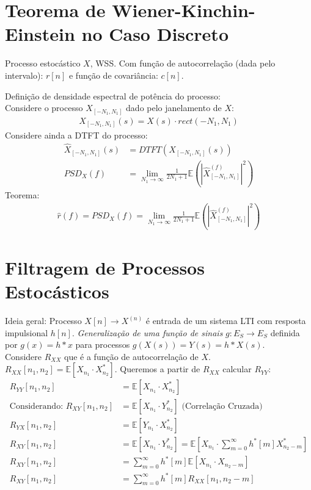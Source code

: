 \documentclass{article}
\begin{document}
\setlength{\abovedisplayskip}{12pt}
\setlength{\belowdisplayskip}{12pt}
\setlength{\abovedisplayshortskip}{0pt}
\setlength{\belowdisplayshortskip}{0pt}
\setlength{\jot}{1pt}

\section{Teorema de Wiener-Kinchin-Einstein no Caso Discreto}
Processo estocástico $X$, WSS. Com função de autocorrelação (dada pelo intervalo): $r[n]$ e função
de covariância: $c[n]$.

Definição de densidade espectral de potência do processo:
\\
Considere o processo $X_{[-N_1,N_1]}$ dado pelo janelamento de $X$:
\begin{align*}
    X_{[-N_1,N_1]}(s) = X(s) \cdot rect(-N_1,N_1)
\end{align*}
Considere ainda a DTFT do processo:
\begin{align*}
    \widehat{X}_{[-N_1,N_1]}(s) &= DTFT(X_{[-N_1,N_1]}(s)) \\
    PSD_X(f) &= \lim_{N_1 \to \infty} \frac{1}{2N_1+1} \mathbb{E}(|\widehat{X}_{[-N_1,N_1]}^{(f)}|^2)
\end{align*}
Teorema:
\begin{align*}
    \widehat{r}(f) = PSD_X(f) = \lim_{N_1 \to \infty} \frac{1}{2N_1+1} \mathbb{E}(|\widehat{X}_{[-N_1,N_1]}^{(f)}|^2)
\end{align*}

\section{Filtragem de Processos Estocásticos}
Ideia geral: Processo $X[n] \to X^{(n)}$ é entrada de um sistema LTI com resposta impulsional
$h[n]$. \textit{Generalização de uma função de sinais} $g: E_S \to E_S$ definida por $g(x) = h*x$
para processos $g(X(s)) = Y(s) = h * X(s)$.
\\
Considere $R_{XX}$ que é a função de autocorrelação de $X$. $R_{XX}[n_1,n_2] =
\mathbb{E}[X_{n_1}\cdot X_{n_2}^*]$. Queremos a partir de $R_{XX}$ calcular $R_{YY}$:
\begin{align*}
    R_{YY}[n_1,n_2] &= \mathbb{E}[X_{n_1}\cdot X_{n_2}^*] \\
    \text{Considerando: } R_{XY}[n_1,n_2] &= \mathbb{E}[X_{n_1}\cdot Y_{n_2}^*] \text{ (Correlação Cruzada)} \\
    R_{YX}[n_1,n_2] &= \mathbb{E}[Y_{n_1}\cdot X_{n_2}^*] \\
    R_{XY}[n_1,n_2] &= \mathbb{E}[X_{n_1}\cdot Y_{n_2}^*] = \mathbb{E}\left[X_{n_1} \cdot \sum_{m=0}^\infty h^*[m]X_{n_2-m}^*\right] \\
    R_{XY}[n_1,n_2] &=  \sum_{m=0}^\infty h^*[m] \mathbb{E}\left[X_{n_1}\cdot X_{n_2-m}\right] \\
    R_{XY}[n_1,n_2] &=  \sum_{m=0}^\infty h^*[m] R_{XX}[n_1,n_2-m]
\end{align*}
\end{document}
